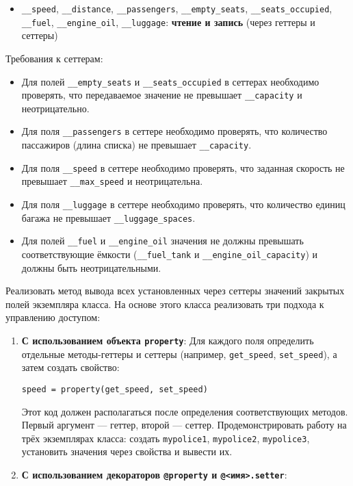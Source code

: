 \begin{enumerate}
\begin{itemize}
    \item \texttt{\_\_speed}, \texttt{\_\_distance}, \texttt{\_\_passengers}, \texttt{\_\_empty\_seats}, \texttt{\_\_seats\_occupied}, \texttt{\_\_fuel}, \texttt{\_\_engine\_oil}, \texttt{\_\_luggage}: \textbf{чтение и запись} (через геттеры и сеттеры)
\end{itemize}
Требования к сеттерам:
\begin{itemize}
    \item Для полей \texttt{\_\_empty\_seats} и \texttt{\_\_seats\_occupied} в сеттерах необходимо проверять, что передаваемое значение не превышает \texttt{\_\_capacity} и неотрицательно.  
    \item Для поля \texttt{\_\_passengers} в сеттере необходимо проверять, что количество пассажиров (длина списка) не превышает \texttt{\_\_capacity}.  
    \item Для поля \texttt{\_\_speed} в сеттере необходимо проверять, что заданная скорость не превышает \texttt{\_\_max\_speed} и неотрицательна.  
    \item Для поля \texttt{\_\_luggage} в сеттере необходимо проверять, что количество единиц багажа не превышает \texttt{\_\_luggage\_spaces}.
    \item Для полей \texttt{\_\_fuel} и \texttt{\_\_engine\_oil} значения не должны превышать соответствующие ёмкости (\texttt{\_\_fuel\_tank} и \texttt{\_\_engine\_oil\_capacity}) и должны быть неотрицательными.
\end{itemize}
Реализовать метод вывода всех установленных через сеттеры значений закрытых полей экземпляра класса.
На основе этого класса реализовать три подхода к управлению доступом:
\begin{enumerate}
    \item \textbf{С использованием объекта \texttt{property}}:  
    Для каждого поля определить отдельные методы-геттеры и сеттеры (например, \texttt{get\_speed}, \texttt{set\_speed}), а затем создать свойство:  
    \begin{verbatim}
speed = property(get_speed, set_speed)
    \end{verbatim}  
    Этот код должен располагаться после определения соответствующих методов. Первый аргумент — геттер, второй — сеттер.  
    Продемонстрировать работу на трёх экземплярах класса: создать \texttt{mypolice1}, \texttt{mypolice2}, \texttt{mypolice3}, установить значения через свойства и вывести их.
    \item \textbf{С использованием декораторов \texttt{@property} и \texttt{@<имя>.setter}}:  

\end{enumerate}
\end{enumerate}
